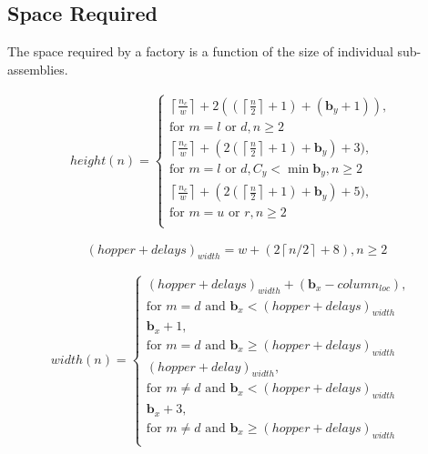 \subsection{Space Required}\label{sec:requiredSpace}
The space required by a factory is a function of the size of individual sub-assemblies.

\begin{align}
height(n)=
\begin{cases}
\left \lceil{   \frac{n_c}{w}}\right \rceil+2((\left \lceil{\frac{n}{2}}\right \rceil+1)+(\mathbf{b}_y+1)),&\\ 
\text{for } m = l \text{ or } d, n \geq 2&\\
\left \lceil{   \frac{n_c}{w}}\right \rceil+(2(\left \lceil{\frac{n}{2}}\right \rceil+1)+\mathbf{b}_y)+3),&\\ 
\text{for } m = l \text{ or } d, C_y  < \min \mathbf{b}_y, n \geq 2&\\
\left \lceil{   \frac{n_c}{w}}\right \rceil+(2(\left \lceil{\frac{n}{2}}\right \rceil+1)+\mathbf{b}_y)+5),&\\ 
\text{for } m = u \text{ or } r, n \geq 2&\\
\end{cases}
\end{align}



\begin{equation}
(hopper+delays)_{width}=w+(2\left \lceil{n/2}\right \rceil+8),  n \geq 2
\end{equation}

\begin{align}
width(n)=
\begin{cases}
(hopper+delays)_{width}+(\mathbf{b}_x-column_{loc}),&\\ 
\text{for } m = d \text{ and } \mathbf{b}_x < (hopper+delays)_{width}&\\
\mathbf{b}_x + 1,&\\ 
\text{for } m = d \text{ and } \mathbf{b}_x \geq (hopper+delays)_{width}&\\
(hopper+delay)_{width},&\\ 
\text{for } m \neq d  \text{ and } \mathbf{b}_x < (hopper+delays)_{width}&\\
\mathbf{b}_x + 3,&\\ 
\text{for } m \neq d \text{ and } \mathbf{b}_x \geq (hopper+delays)_{width}&\\
\end{cases}
\end{align}

